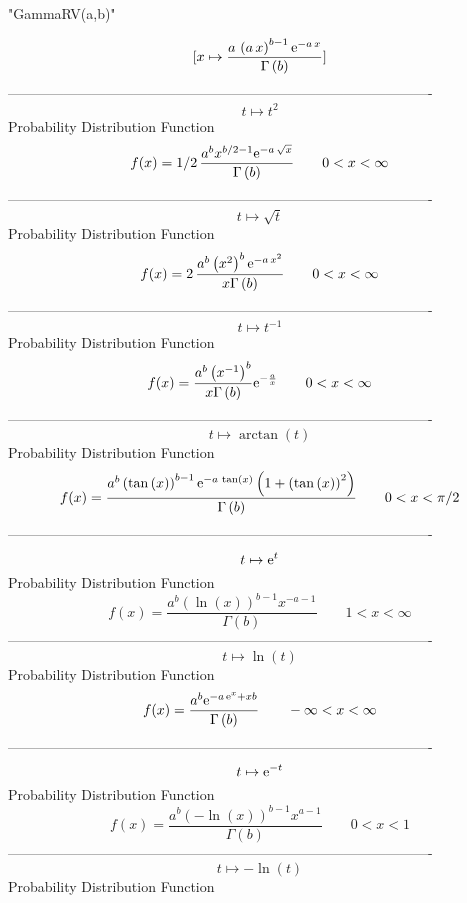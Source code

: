 \documentclass[12pt]{article}
\begin{document}
 
                               "GammaRV(a,b)"

$$[x\mapsto {\frac {a\, \left( a\,x \right) ^{b-1}{{\rm e}^{-a\,x}}}{
\Gamma \left( b \right) }}]
$$-------------------------------------------------------------------------------------------  \\$$t\mapsto {t}^{2}
$$Probability Distribution Function 
$$  f(x)=1/2\,{\frac {{a}^{b}{x}^{b/2-1}{{\rm e}^{-a\,\sqrt {x}}}}{\Gamma
 \left( b \right) }}
 \qquad0
 < x < \infty 
$$-------------------------------------------------------------------------------------------  \\$$t\mapsto \sqrt {t}
$$Probability Distribution Function 
$$  f(x)=2\,{\frac {{a}^{b} \left( {x}^{2} \right) ^{b}{{\rm e}^{-a\,{x}^{2}}}
}{x\Gamma \left( b \right) }}
 \qquad0
 < x < \infty 
$$-------------------------------------------------------------------------------------------  \\$$t\mapsto {t}^{-1}
$$Probability Distribution Function 
$$  f(x)={\frac {{a}^{b} \left( {x}^{-1} \right) ^{b}}{x\Gamma \left( b
 \right) }{{\rm e}^{-{\frac {a}{x}}}}}
 \qquad0
 < x < \infty 
$$-------------------------------------------------------------------------------------------  \\$$t\mapsto \arctan \left( t \right) 
$$Probability Distribution Function 
$$  f(x)={\frac {{a}^{b} \left( \tan \left( x \right)  \right) ^{b-1}{{\rm e}^{
-a\,\tan \left( x \right) }} \left( 1+ \left( \tan \left( x \right) 
 \right) ^{2} \right) }{\Gamma \left( b \right) }}
 \qquad0
 < x < \pi/2
$$-------------------------------------------------------------------------------------------  \\$$t\mapsto {{\rm e}^{t}}
$$Probability Distribution Function 
$$  f(x)={\frac {{a}^{b} \left( \ln  \left( x \right)  \right) ^{b-1}{x}^{-a-1}
}{\Gamma \left( b \right) }}
 \qquad1
 < x < \infty 
$$-------------------------------------------------------------------------------------------  \\$$t\mapsto \ln  \left( t \right) 
$$Probability Distribution Function 
$$  f(x)={\frac {{a}^{b}{{\rm e}^{-a\,{{\rm e}^{x}}+xb}}}{\Gamma \left( b
 \right) }}
 \qquad-\infty 
 < x < \infty 
$$-------------------------------------------------------------------------------------------  \\$$t\mapsto {{\rm e}^{-t}}
$$Probability Distribution Function 
$$  f(x)={\frac {{a}^{b} \left( -\ln  \left( x \right)  \right) ^{b-1}{x}^{a-1}
}{\Gamma \left( b \right) }}
 \qquad0
 < x < 1
$$-------------------------------------------------------------------------------------------  \\$$t\mapsto -\ln  \left( t \right) 
$$Probability Distribution Function 
\end{document}
